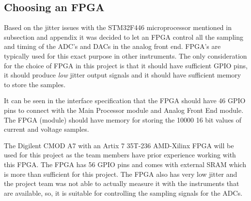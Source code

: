 \subsection{Choosing an FPGA} \label{subsec:ChoosingAnFPGA}

Based on the jitter issues with the STM32F446 microprocessor mentioned in subsection  and appendix  it was decided to let an FPGA control all the sampling and timing of the ADC's and DACs in the analog front end. FPGA's are typically used for this exact purpose in other instruments. The only consideration for the choice of FPGA in this project is that it should have sufficient GPIO pins, it should produce \textit{low} jitter output signals and it should have sufficient memory to store the samples.

It can be seen in the interface specification  that the FPGA should have 46 GPIO pins to connect with the Main Processor module and Analog Front End module. The FPGA (module) should have  memory for storing the 10000 16 bit values of current and voltage samples.

The Digilent CMOD A7\cite{CMOD_A7_AT35T} with an Artix 7 35T-236 AMD-Xilinx FPGA\cite{ARTIX7} will be used for this project as the team members have prior experience working with this FPGA. The FPGA has 56 GPIO pins and comes with  external SRAM which is more than sufficient for this project. The FPGA also has very low jitter and the project team was not able to actually measure it with the instruments that are available, so, it is suitable for controlling the sampling signals for the ADCs.




